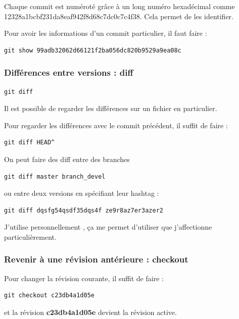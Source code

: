 \documentclass[a4paper,twoside]{article}
\begin{document}
\begin{attention}
Chaque commit est numéroté grâce à un long numéro hexadécimal comme 12328a1bcbf231da\-8eaf942f8d68c7dc0c7c4f38. Cela permet de les identifier.
\end{attention}

Pour avoir les informations d'un commit particulier, il faut faire :
\begin{verbatim}
git show 99adb32062d66121f2ba056dc820b9529a9ea08c
\end{verbatim}

\subsubsection{Différences entre versions : diff}

\begin{verbatim}
git diff
\end{verbatim}

\begin{remarque}
Il est possible de regarder les différences sur un fichier en particulier.
\end{remarque}

Pour regarder les différences avec le commit précédent, il suffit de faire :
\begin{verbatim}
git diff HEAD^
\end{verbatim}

\bigskip

On peut faire des diff entre des branches 
\begin{verbatim}
git diff master branch_devel
\end{verbatim}
ou entre deux versions en spécifiant leur hashtag : 
\begin{verbatim}
git diff dqsfg54qsdf35dqs4f ze9r8az7er3azer2
\end{verbatim}

J'utilise personnellement , ça me permet d'utiliser  que j'affectionne particulièrement.

\subsubsection{Revenir à une révision antérieure : checkout}\label{sec:revenir_en_arriere}
Pour changer la révision courante, il suffit de faire : 
\begin{verbatim}
git checkout c23db4a1d05e
\end{verbatim}
et la révision \textbf{c23db4a1d05e} devient la révision active. 
\end{document}
